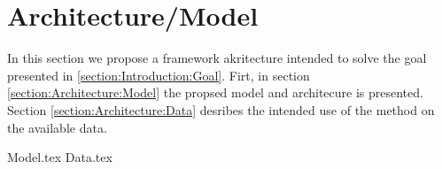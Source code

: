 \chapter{Architecture/Model}
\label{sec:architectureAndModel}

In this section we propose a framework akritecture intended to solve the goal presented in \ref{section:Introduction:Goal}.
Firt, in section \ref{section:Architecture:Model} the propsed model and architecure is presented.
Section \ref{section:Architecture:Data} desribes the intended use of the method on the available data. 

{Model.tex}
{Data.tex}


\iffalse
Here you will present the architecture or model that you have chosen and that is (or will be) implemented in your work. Note that putting algorithms in your report is not desirable but in certain cases these might be placed in the appendix. Code further be avoided in the report itself but may be delivered in the fashion requested by the supervisor or, in the case of masters delivery, submitted as additional documents. 
\fi
